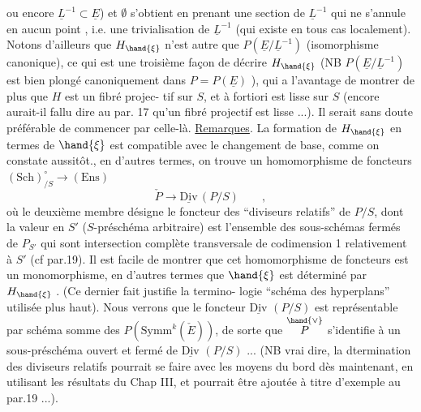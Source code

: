 
ou encore $\underline{L}^{-1}\subset\underline{E}$) et $\emptyset$ s'obtient en prenant une section de $\underline{L}^{-1}$ qui
ne s'annule en aucun point , i.e. une trivialisation de $\underline{L}^{-1}$
(qui existe en tous cas localement). Notons d'ailleurs que $H_{\hand{\xi}}$ n'est
autre que $P(\underline{E}/\underline{L}^{-1})$ (isomorphisme canonique), ce qui est une troisième
façon de décrire $H_{\hand{\xi}}$ (NB $P(\underline{E}/\underline{L}^{-1})$ est bien plongé canoniquement dans
$P = P(\underline{E})$ ), qui a l'avantage de montrer de plus que $H$ est un fibré projec-%
tif sur $S$, et à fortiori est lisse sur $S$ (encore aurait-il fallu dire 
\margin{$\|$} au par. 17 qu'un fibré projectif est lisse ...). Il serait sans doute
\margin{$\|$} préférable de commencer par celle-là.
\uline{Remarques}. La formation de $H_{\hand{\xi}}$ en termes de $\hand{\xi}$ est compatible avec
le changement de base, comme on constate aussitôt., en d'autres termes,
on trouve un homomorphisme de foncteurs $(\mathrm{Sch})^{\circ}_{/S}\to(\mathrm{Ens})$
\[ \check{P} \longrightarrow \underline{\mathrm{Div}}\,(P/S) \qquad , \]
où le deuxième membre désigne le foncteur des ``diviseurs relatifs'' de $P/S$,
dont la valeur en $S'$ ($S$-préschéma arbitraire) est l'ensemble des
sous-schémas fermés de $P_{S'}$ qui sont intersection complète transversale
de codimension 1 relativement à $S'$ (cf par.19). Il est facile de montrer
que cet homomorphisme de foncteurs est un monomorphisme, en d'autres
termes que $\hand{\xi}$ est déterminé par $H_{\hand{\xi}}$ . (Ce dernier fait justifie la termino-%
logie ``schéma des hyperplans'' utilisée plus haut). Nous verrons  \margin{)}
 que le foncteur $\underline{\mathrm{Div}}$ $(P/S)$ est représentable par schéma somme
des $P(\mathrm{Symm}^{k}(\check{E}))$, de sorte que $\overset{\hand{\vee}}{P}$ s'identifie à un sous-préschéma ouvert
et fermé de $\underline{\mathrm{Div}}$ $(P/S)$ ... (NB  vrai dire, la dtermination des diviseurs
\margin{$|$} relatifs pourrait se faire avec les moyens du bord dès maintenant, en
\margin{$|$} utilisant les résultats du Chap III, et pourrait être ajoutée  à titre
\margin{$|$} d'exemple au par.19 ...).

